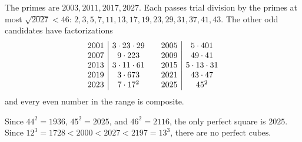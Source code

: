 The primes are $\boxed{2003,2011,2017,2027}$. Each passes trial division by the primes at most $\sqrt{2027}<46$: $2,3,5,7,11,13,17,19,23,29,31,37,41,43$. The other odd candidates have factorizations
\[
\begin{array}{c|c@{\qquad}c|c}
2001&3\cdot23\cdot29&2005&5\cdot401\\
2007&9\cdot223&2009&49\cdot41\\
2013&3\cdot11\cdot61&2015&5\cdot13\cdot31\\
2019&3\cdot673&2021&43\cdot47\\
2023&7\cdot17^2&2025&45^2
\end{array}
\]
and every even number in the range is composite.

Since $44^2=1936$, $45^2=2025$, and $46^2=2116$, the only perfect square is $\boxed{2025}$. Since $12^3=1728<2000<2027<2197=13^3$, there are $\boxed{\text{no perfect cubes}}$.
